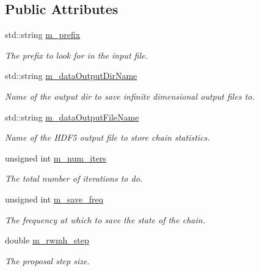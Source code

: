 \subsection*{Public Attributes}
\begin{DoxyCompactItemize}
\item 
std\-::string \hyperlink{class_q_u_e_s_o_1_1_infinite_dimensional_m_c_m_c_sampler_options_a6cb95c7e8adbc6ead99b2cf3fb3aed56}{m\-\_\-prefix}
\begin{DoxyCompactList}\small\item\em The prefix to look for in the input file. \end{DoxyCompactList}\item 
std\-::string \hyperlink{class_q_u_e_s_o_1_1_infinite_dimensional_m_c_m_c_sampler_options_a224d09b8aa3f31aa2134338ae2a60018}{m\-\_\-data\-Output\-Dir\-Name}
\begin{DoxyCompactList}\small\item\em Name of the output dir to save infinite dimensional output files to. \end{DoxyCompactList}\item 
std\-::string \hyperlink{class_q_u_e_s_o_1_1_infinite_dimensional_m_c_m_c_sampler_options_a2146a3f4d0f276081484743bf3c5b5aa}{m\-\_\-data\-Output\-File\-Name}
\begin{DoxyCompactList}\small\item\em Name of the H\-D\-F5 output file to store chain statistics. \end{DoxyCompactList}\item 
unsigned int \hyperlink{class_q_u_e_s_o_1_1_infinite_dimensional_m_c_m_c_sampler_options_a65fbd7c98f6e3820206382da50a0133e}{m\-\_\-num\-\_\-iters}
\begin{DoxyCompactList}\small\item\em The total number of iterations to do. \end{DoxyCompactList}\item 
unsigned int \hyperlink{class_q_u_e_s_o_1_1_infinite_dimensional_m_c_m_c_sampler_options_aa477dfa39894194aecbc064e2d11af56}{m\-\_\-save\-\_\-freq}
\begin{DoxyCompactList}\small\item\em The frequency at which to save the state of the chain. \end{DoxyCompactList}\item 
double \hyperlink{class_q_u_e_s_o_1_1_infinite_dimensional_m_c_m_c_sampler_options_a08b73ed8aa86a07c5ed02394380d0434}{m\-\_\-rwmh\-\_\-step}
\begin{DoxyCompactList}\small\item\em The proposal step size. \end{DoxyCompactList}\end{DoxyCompactItemize}
